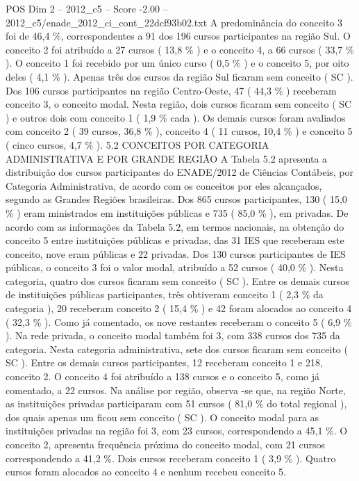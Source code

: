 \begin{textsample}{POS Dim 2 – 2012\_c5 – Score -2.00 – 2012\_c5/enade\_2012\_ci\_cont\_22dcf93b02.txt}
A predominância do conceito 3 foi de 46,4 \%, correspondentes a 91 dos 196 cursos participantes na região Sul.
O conceito 2 foi atribuído a 27 cursos ( 13,8 \% ) e o conceito 4, a 66 cursos ( 33,7 \% ).
O conceito 1 foi recebido por um único curso ( 0,5 \% ) e o conceito 5, por oito deles ( 4,1 \% ).
Apenas três dos cursos da região Sul ficaram sem conceito ( SC ).
Dos 106 cursos participantes na região Centro-Oeste, 47 ( 44,3 \% ) receberam conceito 3, o conceito modal.
Nesta região, dois cursos ficaram sem conceito ( SC ) e outros dois com conceito 1 ( 1,9 \% cada ).
Os demais cursos foram avaliados com conceito 2 ( 39 cursos, 36,8 \% ), conceito 4 ( 11 cursos, 10,4 \% ) e conceito 5 ( cinco cursos, 4,7 \% ). 5.2 CONCEITOS POR CATEGORIA ADMINISTRATIVA E POR GRANDE REGIÃO A Tabela 5.2 apresenta a distribuição dos cursos participantes do ENADE/2012 de Ciências Contábeis, por Categoria Administrativa, de acordo com os conceitos por eles alcançados, segundo as Grandes Regiões brasileiras.
Dos 865 cursos participantes, 130 ( 15,0 \% ) eram ministrados em instituições públicas e 735 ( 85,0 \% ), em privadas.
De acordo com as informações da Tabela 5.2, em termos nacionais, na obtenção do conceito 5 entre instituições públicas e privadas, das 31 IES que receberam este conceito, nove eram públicas e 22 privadas.
Dos 130 cursos participantes de IES públicas, o conceito 3 foi o valor modal, atribuído a 52 cursos ( 40,0 \% ).
Nesta categoria, quatro dos cursos ficaram sem conceito ( SC ).
Entre os demais cursos de instituições públicas participantes, três obtiveram conceito 1 ( 2,3 \% da categoria ), 20 receberam conceito 2 ( 15,4 \% ) e 42 foram alocados ao conceito 4 ( 32,3 \% ).
Como já comentado, os nove restantes receberam o conceito 5 ( 6,9 \% ).
Na rede privada, o conceito modal também foi 3, com 338 cursos dos 735 da categoria.
Nesta categoria administrativa, sete dos cursos ficaram sem conceito ( SC ).
Entre os demais cursos participantes, 12 receberam conceito 1 e 218, conceito 2.
O conceito 4 foi atribuído a 138 cursos e o conceito 5, como já comentado, a 22 cursos.
Na análise por região, observa -se que, na região Norte, as instituições privadas participaram com 51 cursos ( 81,0 \% do total regional ), dos quais apenas um ficou sem conceito ( SC ).
O conceito modal para as instituições privadas na região foi 3, com 23 cursos, correspondendo a 45,1 \%.
O conceito 2, apresenta frequência próxima do conceito modal, com 21 cursos correspondendo a 41,2 \%.
Dois cursos receberam conceito 1 ( 3,9 \% ).
Quatro cursos foram alocados ao conceito 4 e nenhum recebeu conceito 5.

\end{textsample}

